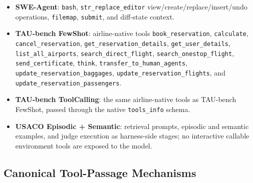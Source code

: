 \begin{itemize}
\item \textbf{SWE-Agent}: \texttt{bash},
\texttt{str\_replace\_editor} view/create/replace/insert/undo operations,
\texttt{filemap}, \texttt{submit}, and diff-state context.
\item \textbf{TAU-bench FewShot}: airline-native tools
\texttt{book\_reservation}, \texttt{calculate},
\texttt{cancel\_reservation}, \texttt{get\_reservation\_details},
\texttt{get\_user\_details}, \texttt{list\_all\_airports},
\texttt{search\_direct\_flight}, \texttt{search\_onestop\_flight},
\texttt{send\_certificate}, \texttt{think},
\texttt{transfer\_to\_human\_agents},
\texttt{update\_reservation\_baggages},
\texttt{update\_reservation\_flights}, and
\texttt{update\_reservation\_passengers}.
\item \textbf{TAU-bench ToolCalling}: the same airline-native tools as
TAU-bench FewShot, passed through the native \texttt{tools\_info} schema.
\item \textbf{USACO Episodic + Semantic}: retrieval prompts, episodic and
semantic examples, and judge execution as harness-side stages; no interactive
callable environment tools are exposed to the model.
\end{itemize}
\endgroup

\subsection{Canonical Tool-Passage Mechanisms}

